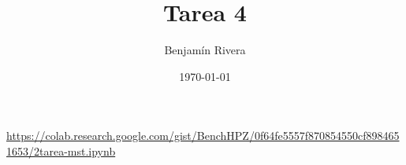 \documentclass[11pt, a5paper]{article}
\title{\textbf{Tarea 4}}
\author{Benjamín Rivera}
\date{\today}
\begin{document}
\maketitle
\thispagestyle{empty}


\begin{center}
	\url{https://colab.research.google.com/gist/BenchHPZ/0f64fe5557f870854550cf8984651653/2tarea-mst.ipynb}
\end{center}
\end{document}
